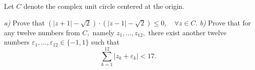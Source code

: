 Let $ C $ denote the complex unit circle centered at the origin.

\textit{a)} Prove that $ \left( |z+1|-\sqrt 2 \right)\cdot \left( |z-1|-\sqrt 2 \right)\le 0,\quad\forall z\in C. $
\textit{b)} Prove that for any twelve numbers from $ C, $ namely $ z_1,\ldots ,z_{12} , $ there exist another twelve numbers $ \varepsilon_1,\ldots ,\varepsilon_{12}\in\{-1,1\} $ such that
$$ \sum_{k=1}^{12} \left| z_k+\varepsilon_k \right| <17. $$